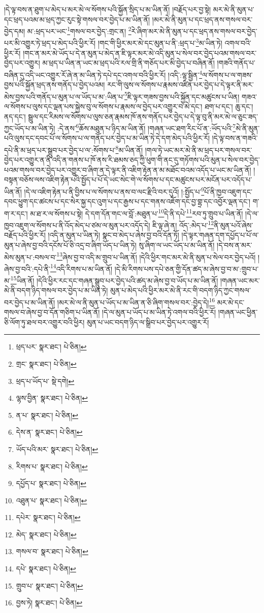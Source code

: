 །དེ་ལྟ་བས་ན་ཐུག་པ་མེད་པ་མར་མེ་ལ་སོགས་པའི་སྐྱོན་སྲིད་པ་མ་ཡིན་ནོ། །བརྗོད་པར་བྱ་སྟེ། མར་མེ་ནི་མུན་པ་དང་ཕྲད་པའམ་མ་ཕྲད་ཀྱང་རུང་སྟེ་གསལ་བར་བྱེད་པ་མ་ཡིན་ནོ། །མར་མེ་ནི་མུན་པ་དང་ཕྲད་ནས་གསལ་བར་བྱེད་དམ། མ་:ཕྲད་པར་ཡང་\footnote{ཕྲད་པར་  སྣར་ཐང་།  པེ་ཅིན། }གསལ་བར་བྱེད་:གྲང་ན། \footnote{གྲང་  སྣར་ཐང་།  པེ་ཅིན། }རེ་ཞིག་མར་མེ་ནི་མུན་པ་དང་ཕྲད་ནས་གསལ་བར་བྱེད་པར་མི་འགྱུར་ཏེ་ཕྲད་པ་མེད་པའི་ཕྱིར་རོ། །གང་གི་ཕྱིར་མར་མེ་དང་མུན་པ་ནི་:ཕྲད་པ་\footnote{ཕྲད་པ་ཡོད་པ་  སྡེ་དགེ། }མ་ཡིན་ཏེ། འགལ་བའི་ཕྱིར་རོ། །གང་ན་མར་མེ་ཡོད་པ་དེ་ན་མུན་པ་མེད་ན་ཇི་ལྟར་མར་མེ་འདི་མུན་པ་སེལ་བར་བྱེད་པའམ་གསལ་བར་བྱེད་པར་འགྱུར། མ་ཕྲད་པ་ཡིན་ན་ཡང་མ་ཕྲད་པའི་རལ་གྲི་ནི་གཅོད་པར་མི་བྱེད་པ་བཞིན་ནོ། །གཟའི་གནོད་པ་བཞིན་དུ་འདི་ཡང་འགྱུར་རོ་ཞེ་ན་མ་ཡིན་ཏེ་དཔེ་དང་འགལ་བའི་ཕྱིར་རོ། །འདི་:ལྷ་སྦྱིན་\footnote{ལྷས་བྱིན་  སྣར་ཐང་།  པེ་ཅིན། }ལ་སོགས་པ་ལ་གཟས་བྱས་པའི་སྐྱོན་ཕྲད་ནས་གནོད་པ་བྱེད་པའམ། རང་གི་ལུས་ལ་སོགས་པ་རྣམས་འཛིན་པར་བྱེད་པ་དེ་ལྟར་ནི་མར་མེས་བྱས་པའི་གནོད་པ་མུན་པ་ལ་ཡོད་པ་མ་:ཡིན་པ་\footnote{ན་པ་  སྣར་ཐང་།  པེ་ཅིན། }ཇི་ལྟར་གཟས་བྱས་པའི་སྐྱོན་དང་མཚུངས་པ་ཡིན། གཟའ་ལ་སོགས་པ་ལུས་དང་ལྡན་པས་སྐྱེས་བུ་ལ་སོགས་པ་རྣམས་ལ་བྱེད་པར་འགྱུར་བ་མེ་དང་། ཐག་པ་དང་། ཆུ་དང་། ནད་དང་། སྦྲུལ་དང་རིམས་ལ་སོགས་པ་ལུས་ཅན་རྣམས་ཁོ་ནས་གནོད་པར་བྱེད་པ་དེ་ལྟ་བུ་ནི་མར་མེ་ལ་ཅུང་ཟད་ཀྱང་ཡོད་པ་མ་ཡིན་ཏེ། :དེ་ནས་\footnote{དེས་ན་  སྣར་ཐང་།  པེ་ཅིན། }ཆོས་མཐུན་པ་ཉིད་མ་ཡིན་ནོ། །གཞན་ཡང་ཐག་རིང་པོ་ན་:ཡོད་པའི་\footnote{ཡོད་པའི་མར་  སྣར་ཐང་།  པེ་ཅིན། }མེ་ནི་མུན་པའི་ལུས་དང་དབང་པོ་ལ་སོགས་པ་ལ་གནོད་པར་བྱེད་པ་མ་ཡིན་ཏེ་དེ་དག་མེད་པའི་ཕྱིར་རོ། །དེ་ལྟ་བས་ན་གཟའི་དཔེ་ནི་མ་ཕྲད་པར་སྒྲུབ་པར་བྱེད་པ་ལ་:སོགས་པ་\footnote{རིགས་པ་  སྣར་ཐང་།  པེ་ཅིན། }མ་ཡིན་ནོ། །གལ་ཏེ་ཡང་མར་མེ་ནི་མ་ཕྲད་པར་གསལ་བར་བྱེད་པར་འགྱུར་ན་ནི་འདི་ན་གནས་པ་ཁོ་ནས་རི་ཐམས་ཅད་ཀྱི་ཕུག་གི་ནང་དུ་གཏོགས་པའི་མུན་པ་སེལ་བར་བྱེད་པའམ་གསལ་བར་བྱེད་པར་འགྱུར་བ་ཞིག་ན་དེ་ལྟར་ནི་འཇིག་རྟེན་ན་མ་མཐོང་བའམ་འདོད་པ་ཡང་མ་ཡིན་ནོ། །བསྟན་བཅོས་ལས་འཇིག་རྟེན་པའི་སྤྱོད་པ་པོ་དེ་ཡང་སེང་གེ་ལ་སོགས་པ་དང་མཚུངས་པར་མངོན་པར་འདོད་པ་ཡིན་ནོ། །དེ་ལ་འཇིག་རྟེན་པ་ནི་བྱིས་པ་ལ་སོགས་པ་ནས་བ་ལང་རྫིའི་བར་དུའོ། །:སྤྱོད་པ་\footnote{དཔྱོད་པ་  སྣར་ཐང་།  པེ་ཅིན། }པོ་ནི་ཁྱབ་འཇུག་དང་དབང་ཕྱུག་དང་ཚངས་པ་དང་སེར་སྐྱ་དང་འུག་པ་དང་རྒྱས་པ་དང་གནས་འཇོག་དང་བྱ་གྷྲ་དང་འབྱོར་ལྡན་དང་། ག་ག་ར་དང་། མ་ཐ་ར་ལ་སོགས་པ་སྟེ། དེ་དག་དོན་གང་ལ་བློ་:མཐུན་པ་\footnote{འཐུན་པ་  སྣར་ཐང་།  པེ་ཅིན། }དེ་ནི་དཔེ་\footnote{དཔེར་  སྣར་ཐང་།  པེ་ཅིན། }རབ་ཏུ་གྲུབ་པ་ཡིན་ནོ། །དེ་ལ་ཁྱབ་འཇུག་ལ་སོགས་པ་ནི་འོད་མེད་པ་ཙམ་ལ་མུན་པར་འདོད་དེ། ཇི་ལྟ་ཞེ་ན། འོད་:མེད་པ་\footnote{མེད་  སྣར་ཐང་།  པེ་ཅིན། }ནི་མུན་པའོ་ཞེས་བརྗོད་པའི་ཕྱིར་རོ། །འདི་ན་མུན་པ་ཡིན་ཏེ། སྣང་བ་མེད་པ་ཞེས་བྱ་བའི་དོན་ཏོ། །དེ་ལྟར་གཞན་དག་དཔྱོད་པ་པོ་ལ་མུན་པ་ཞེས་བྱ་བའི་དངོས་པོ་ཅི་འདྲ་བ་ཞིག་ཡོད་པ་ཡིན་ཏེ། སུ་ཞིག་ལ་ཡང་ཡོད་པ་མ་ཡིན་ནོ། །དེ་བས་ན་མར་མེས་མུན་པ་:བསལ་བ་\footnote{གསལ་བ་  སྣར་ཐང་།  པེ་ཅིན། }ཞེས་བྱ་བ་འདི་མ་གྲུབ་པ་ཡིན་ནོ། །དེའི་ཕྱིར་གང་མར་མེ་ནི་མུན་པ་སེལ་བར་བྱེད་པའོ། །ཞེས་བྱ་བའི་:དཔེ་ནི་\footnote{དཔེ་  སྣར་ཐང་།  པེ་ཅིན། }འདི་རིགས་པ་མ་ཡིན་ནོ། །དེ་མི་རིགས་པས་དཔེ་ཅན་གྱི་དོན་ཚད་མ་ཞེས་བྱ་བ་མ་:གྲུབ་པ་མ་\footnote{གྲུབ་པ་  སྣར་ཐང་།  པེ་ཅིན། }ཡིན་ནོ། །དེའི་ཕྱིར་རང་དང་གཞན་སྒྲུབ་པར་བྱེད་པའི་ཚད་མ་ཞེས་བྱ་བ་ཡོད་པ་མ་ཡིན་ནོ། །གཞན་ཡང་མར་མེ་ནི་བདག་ཉིད་གསལ་བར་བྱེད་པ་མ་ཡིན་ཏེ། མུན་པ་མེད་པའི་ཕྱིར་མར་མེ་ནི་རང་གི་བདག་ཉིད་ཀྱང་གསལ་བར་བྱེད་པ་མ་ཡིན་ནོ། །མར་མེ་ལ་ནི་མུན་པ་ཡོད་པ་མ་ཡིན་ན་ཅི་ཞིག་གསལ་བར་:བྱེད་དེ།\footnote{བྱས་ཏེ།  སྣར་ཐང་།  པེ་ཅིན། } མར་མེ་དང་གསལ་བ་ཞེས་བྱ་བ་དོན་གཅིག་པ་ཡིན་ནོ། །དེ་ལ་མུན་པ་ཡོད་པ་མ་ཡིན་ཏེ་འགལ་བའི་ཕྱིར་རོ། །གཞན་ཡང་ཕྱིན་ཅི་ལོག་ཏུ་ཐལ་བར་འགྱུར་བའི་ཕྱིར། མུན་པ་ཡང་བདག་ཉིད་ལ་སྒྲིབ་པར་བྱེད་པར་འགྱུར་རོ། 